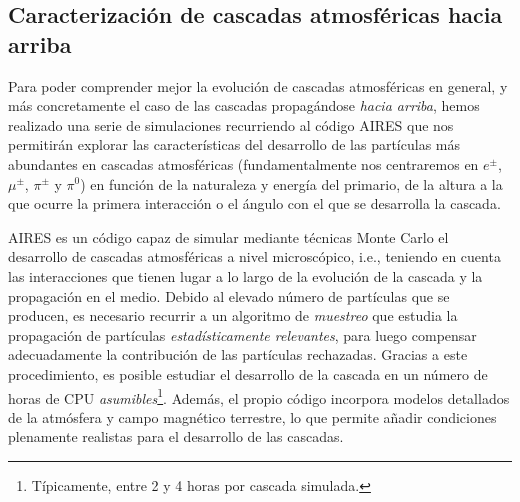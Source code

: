 \documentclass[12 pt, a4paper]{article} %
\numberwithin{equation}{section}
\numberwithin{figure}{section}
\numberwithin{table}{section}
\begin{document}
	\subsection{Caracterización de cascadas atmosféricas hacia arriba}\label{sec22}
	Para poder comprender mejor la evolución de cascadas atmosféricas en general, y más concretamente el caso de las cascadas propagándose \textit{hacia arriba}, hemos realizado una serie de simulaciones recurriendo al código AIRES \cite{https://doi.org/10.13140/rg.2.2.12566.40002} que nos permitirán explorar las características del desarrollo de las partículas más abundantes en cascadas atmosféricas (fundamentalmente nos centraremos en $e^\pm$, $\mu^\pm$, $\pi^\pm$ y $\pi^0$) en función de la naturaleza y energía del primario, de la altura a la que ocurre la primera interacción o el ángulo con el que se desarrolla la cascada. 
	
	AIRES es un código capaz de simular mediante técnicas Monte Carlo el desarrollo de cascadas atmosféricas a nivel microscópico, i.e., teniendo en cuenta las interacciones que tienen lugar a lo largo de la evolución de la cascada y la propagación en el medio. Debido al elevado número de partículas que se producen, es necesario recurrir a un algoritmo de \textit{muestreo} que estudia la propagación de partículas \textit{estadísticamente relevantes}, para luego compensar adecuadamente la contribución de las partículas rechazadas. Gracias a este procedimiento, es posible estudiar el desarrollo de la cascada en un número de horas de CPU \textit{asumibles}\footnote{Típicamente, entre 2 y 4 horas por cascada simulada.}. Además, el propio código incorpora modelos detallados de la atmósfera y campo magnético terrestre, lo que permite añadir condiciones plenamente realistas para el desarrollo de las cascadas.
	
\end{document}
